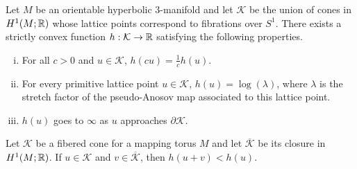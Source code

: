 
\begin{thm}
  \label{thm:fm}
  Let $M$ be an orientable hyperbolic $3$-manifold and let $\mathcal{K}$ be the union of cones in $H^1(M; \mathbb{R})$ whose lattice points correspond to fibrations over $S^1$.
  There exists a strictly convex function $h: \mathcal{K} \to \mathbb{R}$ satisfying the following properties.
  \begin{enumerate}[(i)]
  \item For all $c > 0$ and $u \in \mathcal{K}$, $h(cu) =  \frac{1}{c}h(u)$.
  \item For every primitive lattice point $u \in \mathcal{K}$, $h(u) = \log(\lambda)$, where $\lambda$ is the
    stretch factor of the pseudo-Anosov map associated to this lattice point.
  \item $h(u)$ goes to $\infty$ as $u$ approaches $\partial \mathcal{K}$.
  \end{enumerate}
\end{thm}

\begin{thm}
  \label{thm:alm}
  Let $\mathcal{K}$ be a fibered cone for a mapping torus $M$ and let $\overline{\mathcal{K}}$ be its closure
  in $H^1(M;\mathbb{R})$. If $u \in \mathcal{K}$ and $v \in \overline{\mathcal{K}}$, then $h(u+v) < h(u)$.
\end{thm}

